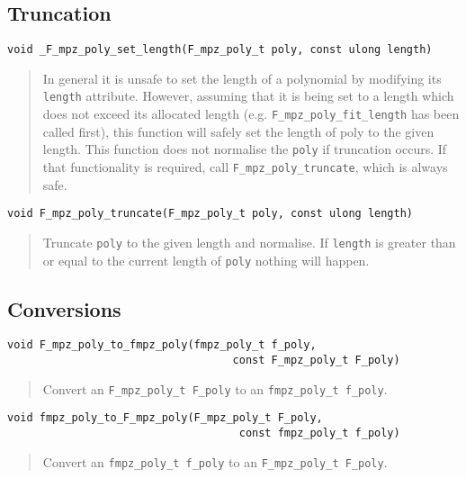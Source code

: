 \documentclass[a4paper,10pt]{article}
\newcommand{\code}{\lstinline}
\begin{document}
\subsection{Truncation}

\begin{lstlisting}
void _F_mpz_poly_set_length(F_mpz_poly_t poly, const ulong length)
\end{lstlisting}
\begin{quote}
In general it is unsafe to set the length of a polynomial by modifying its \code{length} attribute. 
However, assuming that it is being set to a length which does not exceed its allocated length (e.g.
\code{F_mpz_poly_fit_length} has been called first), this function will safely set the length of 
poly to the given length. This function does not normalise the \code{poly} if truncation occurs. If
that functionality is required, call \code{F_mpz_poly_truncate}, which is always safe.
\end{quote}

\begin{lstlisting}
void F_mpz_poly_truncate(F_mpz_poly_t poly, const ulong length)
\end{lstlisting}
\begin{quote}
Truncate \code{poly} to the given length and normalise. If \code{length} is greater than or equal to
the current length of \code{poly} nothing will happen.
\end{quote}

\subsection{Conversions}

\begin{lstlisting}
void F_mpz_poly_to_fmpz_poly(fmpz_poly_t f_poly, 
                                   const F_mpz_poly_t F_poly)
\end{lstlisting}
\begin{quote}
Convert an \code{F_mpz_poly_t F_poly} to an \code{fmpz_poly_t f_poly}.
\end{quote}

\begin{lstlisting}
void fmpz_poly_to_F_mpz_poly(F_mpz_poly_t F_poly, 
                                    const fmpz_poly_t f_poly)
\end{lstlisting}
\begin{quote}
Convert an \code{fmpz_poly_t f_poly} to an \code{F_mpz_poly_t F_poly}.
\end{quote}
\end{document}

